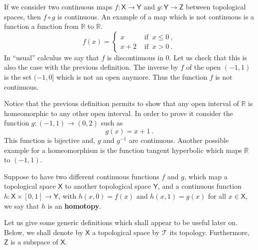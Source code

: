 \documentclass[11pt]{book}
\newcommand{\Tcal}{\mathcal{T}}
\newcommand{\Rbb}{\mathbb{R}}
\newcommand{\Xsf}{\mathsf{X}}
\newcommand{\Ysf}{\mathsf{Y}}
\newcommand{\Zsf}{\mathsf{Z}}
\theoremstyle{break}
\begin{document}
If we consider two continuous maps $f : \Xsf \to \Ysf$ and $g : \Ysf \to \Zsf$ between topological spaces, then $f \circ g$ is continuous. An example of a map which is not continuous is a function a function from $\Rbb$ to $\Rbb$.
%
\begin{equation*}
f(x) = \left\{
\begin{array}{ll}
x & \mbox{ if } \ x \leq 0 \ , \\
x + 2 & \mbox{ if } \ x > 0 \ .
\end{array}
\right.
\end{equation*}
%
In ``usual'' calculus we say that $f$ is discontinuous in $0$. Let us check that this is also the case with the previous definition. The inverse by $f$ of the open $(-1,1)$ is the set $(-1,0]$ which is not an open anymore. Thus the function $f$ is not continuous.


Notice that the previous definition permits to show that any open interval of $\Rbb$ is homeomorphic to any other open interval. In order to prove it consider the function $g : (-1,1) \to (0,2)$ such as
%
\begin{equation*}
g(x) = x + 1 \ . 
\end{equation*}
%
This function is bijective and, $g$ and $g^{-1}$ are continuous. Another possible example for a homeomorphism is the function tangent hyperbolic which maps $\Rbb$ to $(-1,1)$.


\bigskip


Suppose to have two different continuous functions $f$ and $g$, which map a topological space $\Xsf$ to another topological space $\Ysf$, and a continuous function $h : \Xsf \times [0,1] \to \Ysf$, with  $h(x,0) = f(x)$ and $h(x,1) = g(x)$ for all $x \in \Xsf$, we say that $h$ is an \textbf{homotopy}. 

\bigskip


Let us give some generic definitions which shall appear to be useful later on. Below, we shall denote by $\Xsf$ a topological space by $\Tcal$ its topology. Furthermore, $\Zsf$ is a subspace of $\Xsf$.
\end{document}
